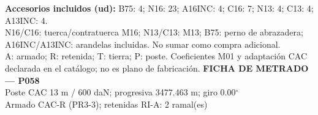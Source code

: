 \begingroup\scriptsize
\textbf{Accesorios incluidos (ud):} B75: 4; N16: 23; A16INC: 4; C16: 7; N13: 4; C13: 4; A13INC: 4.\\
N16/C16: tuerca/contratuerca M16; N13/C13: M13; B75: perno de abrazadera; A16INC/A13INC: arandelas incluidas. No sumar como compra adicional.\\
A: armado; R: retenida; T: tierra; P: poste. Coeficientes M01 y adaptación CAC declarada en el catálogo; no es plano de fabricación.
\endgroup\endgroup
\clearpage{}
\begingroup\small\setlength{\parskip}{3pt}\renewcommand{\arraystretch}{1.05}
\textbf{\large FICHA DE METRADO — P058}\\[4pt]
Poste CAC 13 m / 600 daN; progresiva 3477.463 m; giro 0.00\ensuremath{^\circ}\\
Armado CAC-R (PR3-3); retenidas RI-A: 2 ramal(es)\\
\begingroup\scriptsize
